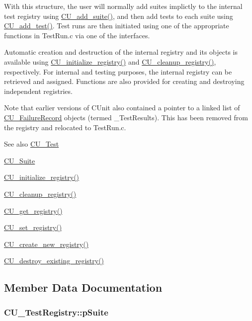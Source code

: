 With this structure, the user will normally add suites implictly to the internal test registry using \hyperlink{group___framework_ga94b8f1bbbd93b154a60bb1d43391b48a}{C\+U\+\_\+add\+\_\+suite()}, and then add tests to each suite using \hyperlink{group___framework_gad9f198a8a5fa8cc6870c3c8be873869f}{C\+U\+\_\+add\+\_\+test()}. Test runs are then initiated using one of the appropriate functions in Test\+Run.\+c via one of the interfaces. 

Automatic creation and destruction of the internal registry and its objects is available using \hyperlink{group___framework_ga3477b2d3e57c8f8aba36bbbdfa54920d}{C\+U\+\_\+initialize\+\_\+registry()} and \hyperlink{group___framework_ga183eb7d7f79e149c767237cfef52cb82}{C\+U\+\_\+cleanup\+\_\+registry()}, respectively. For internal and testing purposes, the internal registry can be retrieved and assigned. Functions are also provided for creating and destroying independent registries. 

Note that earlier versions of C\+Unit also contained a pointer to a linked list of \hyperlink{struct_c_u___failure_record}{C\+U\+\_\+\+Failure\+Record} objects (termed \+\_\+\+Test\+Results). This has been removed from the registry and relocated to Test\+Run.\+c. \begin{DoxySeeAlso}{See also}
\hyperlink{struct_c_u___test}{C\+U\+\_\+\+Test} 

\hyperlink{struct_c_u___suite}{C\+U\+\_\+\+Suite} 

\hyperlink{group___framework_ga3477b2d3e57c8f8aba36bbbdfa54920d}{C\+U\+\_\+initialize\+\_\+registry()} 

\hyperlink{group___framework_ga183eb7d7f79e149c767237cfef52cb82}{C\+U\+\_\+cleanup\+\_\+registry()} 

\hyperlink{group___framework_gacdc4bab7b0492ed1e3a4e076677de22e}{C\+U\+\_\+get\+\_\+registry()} 

\hyperlink{group___framework_gaaec6d8893d61bfff165775385851562d}{C\+U\+\_\+set\+\_\+registry()} 

\hyperlink{group___framework_ga5d2ce564b228122842f515cb4e5beda2}{C\+U\+\_\+create\+\_\+new\+\_\+registry()} 

\hyperlink{group___framework_ga7c46b0ae888482411575c93d5d780b0d}{C\+U\+\_\+destroy\+\_\+existing\+\_\+registry()} 
\end{DoxySeeAlso}


\subsection{Member Data Documentation}
\hypertarget{struct_c_u___test_registry_ad58e6cd1dd4e6579eb255265593b9da8}{
\subsubsection[{p\+Suite}]{ C\+U\+\_\+\+Test\+Registry\+::p\+Suite}}\label{struct_c_u___test_registry_ad58e6cd1dd4e6579eb255265593b9da8}


